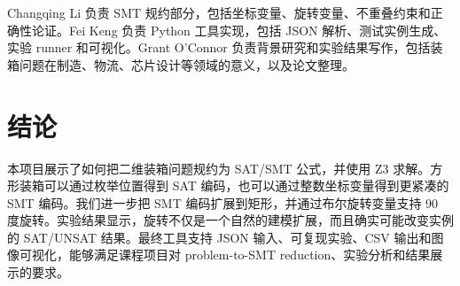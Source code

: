 \documentclass[UTF8,11pt]{ctexart}
\begin{document}
Changqing Li 负责 SMT 规约部分，包括坐标变量、旋转变量、不重叠约束和正确性论证。Fei Keng 负责 Python 工具实现，包括 JSON 解析、测试实例生成、实验 runner 和可视化。Grant O'Connor 负责背景研究和实验结果写作，包括装箱问题在制造、物流、芯片设计等领域的意义，以及论文整理。

\section{结论}

本项目展示了如何把二维装箱问题规约为 SAT/SMT 公式，并使用 Z3 求解。方形装箱可以通过枚举位置得到 SAT 编码，也可以通过整数坐标变量得到更紧凑的 SMT 编码。我们进一步把 SMT 编码扩展到矩形，并通过布尔旋转变量支持 90 度旋转。实验结果显示，旋转不仅是一个自然的建模扩展，而且确实可能改变实例的 SAT/UNSAT 结果。最终工具支持 JSON 输入、可复现实验、CSV 输出和图像可视化，能够满足课程项目对 problem-to-SMT reduction、实验分析和结果展示的要求。



\end{document}
